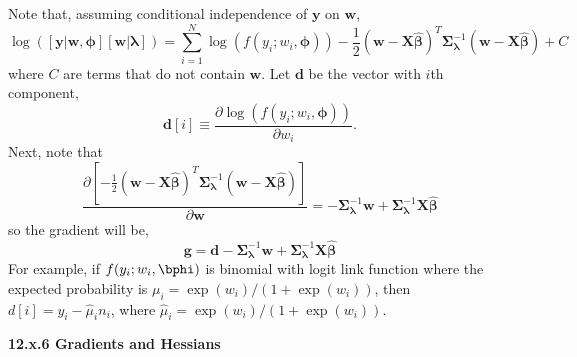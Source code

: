 \documentclass[12pt, titlepage]{article}
\begin{document}
Note that, assuming conditional independence of $\mathbf{y}$ on $\mathbf{w}$,
$$
\log([\mathbf{y}|\mathbf{w},\boldsymbol{\phi}][\mathbf{w}|\boldsymbol{\lambda}]) = \sum_{i = 1}^N \log(f(y_i;w_i,\boldsymbol{\phi})) - \frac{1}{2}(\mathbf{w} - \mathbf{X}\hat{\boldsymbol{\beta}})^{T}\boldsymbol{\Sigma}_{\boldsymbol{\lambda}}^{-1}(\mathbf{w} - \mathbf{X}\hat{\boldsymbol{\beta}}) + C
$$
where $C$ are terms that do not contain $\mathbf{w}$. Let $\mathbf{d}$ be the vector with $i$th component,
$$
\mathbf{d}[i] \equiv \frac{\partial\log(f(y_i;w_i,\boldsymbol{\phi}))}{\partial w_i}.
$$
Next, note that
$$
\frac{\partial [-\frac{1}{2}(\mathbf{w} - \mathbf{X}\hat{\boldsymbol{\beta}})^{T}\boldsymbol{\Sigma}_{\boldsymbol{\lambda}}^{-1}(\mathbf{w} - \mathbf{X}\hat{\boldsymbol{\beta}})]}{\partial \mathbf{w}} = -\boldsymbol{\Sigma}_{\boldsymbol{\lambda}}^{-1}\mathbf{w} + \boldsymbol{\Sigma}_{\boldsymbol{\lambda}}^{-1}\boldsymbol{X}\hat{\boldsymbol{\beta}}
$$
so the gradient will be,
\[
\mathbf{g} = \mathbf{d} - \boldsymbol{\Sigma}_{\boldsymbol{\lambda}}^{-1}\mathbf{w} + \boldsymbol{\Sigma}_{\boldsymbol{\lambda}}^{-1}\mathbf{X}\hat{\boldsymbol{\beta}}
\]
For example, if $f(y_i;w_i,\bphi)$ is binomial with logit link function where the expected probability is $\mu_{i} = \exp(w_{i})/(1 + \exp(w_{i}))$, then $d[i] = y_i - \hat{\mu}_{i}n_i$,
where $\hat{\mu}_i = \exp({w_i})/(1 + \exp({w_i}))$.  


\vspace{.5cm}
{\large \flushleft \textbf{12.x.6 Gradients and Hessians}}
\vspace{.5cm}


\end{document}
